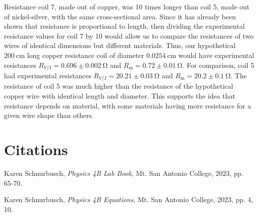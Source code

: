 \documentclass[12pt]{iopart} %
\gdef\units#1{~\mathrm{#1}}
\begin{document}
Resistance coil 7, made out of copper, was 10 times longer than coil 5, made out of nickel-silver, with the same cross-sectional area. 
Since it has already been shown that resistance is proportional to length, then dividing the experimental resistance values for coil 7 by 10 would allow us to compare the resistances of two wires of identical dimensions but different materials.
Thus, our hypothetical $200 \units{cm}$ long copper resistance coil of diameter $0.0254 \units{cm}$ would have experimental resistances $R_{V/I} = 0.696 \pm 0.002 \units{\Omega}$ and $R_\mathrm{m} = 0.72 \pm 0.01 \units{\Omega}$.
For comparison, coil 5 had experimental resistances $R_{V/I} = 20.21 \pm 0.03 \units{\Omega}$ and $R_\mathrm{m} = 20.2 \pm 0.1 \units{\Omega}$.
The resistance of coil 5 was much higher than the resistance of the hypothetical copper wire with identical length and diameter.
This supports the idea that resistance depends on material, with some materials having more resistance for a given wire shape than others.

\section{Citations}

\begin{thebibliography}{9}

  Karen Schnurbusch,
  \textit{Physics 4B Lab Book},
  Mt. San Antonio College,
  2023,
  pp. 65-70.

  Karen Schnurbusch,
  \textit{Physics 4B Equations},
  Mt. San Antonio College,
  2023,
  pp. 4, 10.

\end{thebibliography}
\end{document}
